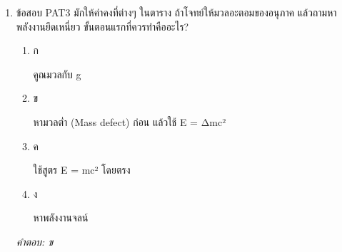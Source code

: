 \documentclass[12pt]{article}
\begin{document}
\begin{enumerate}[label=\arabic*., itemsep=0.5\baselineskip, topsep=0.5\baselineskip, leftmargin=*]
\item ข้อสอบ PAT3 มักให้ค่าคงที่ต่างๆ ในตาราง ถ้าโจทย์ให้มวลอะตอมของอนุภาค แล้วถามหาพลังงานยึดเหนี่ยว ขั้นตอนแรกที่ควรทำคืออะไร?
\begin{enumerate}[label=\alph*)., itemsep=0.3\baselineskip, topsep=0.3\baselineskip]
\item ก\ 
\begin{minipage}[t]{0.9\linewidth}
\raggedright คูณมวลกับ g
\end{minipage}
\item ข\ 
\begin{minipage}[t]{0.9\linewidth}
\raggedright หามวลต่ำ (Mass defect) ก่อน แล้วใช้ E = Δmc²
\end{minipage}
\item ค\ 
\begin{minipage}[t]{0.9\linewidth}
\raggedright ใช้สูตร E = mc² โดยตรง
\end{minipage}
\item ง\ 
\begin{minipage}[t]{0.9\linewidth}
\raggedright หาพลังงานจลน์
\end{minipage}
\end{enumerate}
\vspace{-0.3\baselineskip}
\begin{small}
\textit{คำตอบ: ข}
\end{small}

\end{enumerate}
\end{document}
